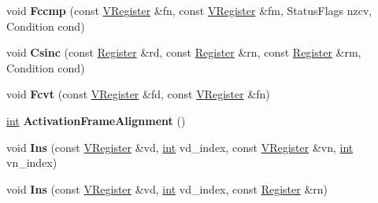 \begin{DoxyCompactItemize}
\mbox{\label{classv8_1_1internal_1_1TurboAssembler_a629bbc51a2f54b61bebb9b1ab20e5342}} 
void {\bfseries Fccmp} (const \mbox{\hyperlink{classv8_1_1internal_1_1VRegister}{V\+Register}} \&fn, const \mbox{\hyperlink{classv8_1_1internal_1_1VRegister}{V\+Register}} \&fm, Status\+Flags nzcv, Condition cond)
\item 
\mbox{\label{classv8_1_1internal_1_1TurboAssembler_a60408e3574c3f53d828dd35fb4e85237}} 
void {\bfseries Csinc} (const \mbox{\hyperlink{classv8_1_1internal_1_1Register}{Register}} \&rd, const \mbox{\hyperlink{classv8_1_1internal_1_1Register}{Register}} \&rn, const \mbox{\hyperlink{classv8_1_1internal_1_1Register}{Register}} \&rm, Condition cond)
\item 
\mbox{\label{classv8_1_1internal_1_1TurboAssembler_a8cad82467566cbb8453c532dbfd73f6f}} 
void {\bfseries Fcvt} (const \mbox{\hyperlink{classv8_1_1internal_1_1VRegister}{V\+Register}} \&fd, const \mbox{\hyperlink{classv8_1_1internal_1_1VRegister}{V\+Register}} \&fn)
\item 
\mbox{\label{classv8_1_1internal_1_1TurboAssembler_a69d9e7c3f3f53c186296d99461b00e57}} 
\mbox{\hyperlink{classint}{int}} {\bfseries Activation\+Frame\+Alignment} ()
\item 
\mbox{\label{classv8_1_1internal_1_1TurboAssembler_a9e07064ba9c18020c5ccb90c6058d96a}} 
void {\bfseries Ins} (const \mbox{\hyperlink{classv8_1_1internal_1_1VRegister}{V\+Register}} \&vd, \mbox{\hyperlink{classint}{int}} vd\+\_\+index, const \mbox{\hyperlink{classv8_1_1internal_1_1VRegister}{V\+Register}} \&vn, \mbox{\hyperlink{classint}{int}} vn\+\_\+index)
\item 
\mbox{\label{classv8_1_1internal_1_1TurboAssembler_ae3d19c2550e5c5cc0a502e5a40c79422}} 
void {\bfseries Ins} (const \mbox{\hyperlink{classv8_1_1internal_1_1VRegister}{V\+Register}} \&vd, \mbox{\hyperlink{classint}{int}} vd\+\_\+index, const \mbox{\hyperlink{classv8_1_1internal_1_1Register}{Register}} \&rn)
\item 
\mbox{\label{classv8_1_1internal_1_1TurboAssembler_a69264dad792e3b1ea11bbc4f5e7ccaf3}} 

\end{DoxyCompactItemize}
